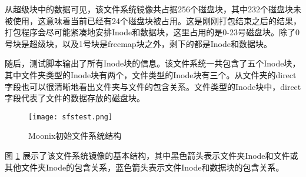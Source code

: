 从超级块中的数据可见，该文件系统镜像共占据256个磁盘块，其中232个磁盘块未被使用，这意味着当前已经有24个磁盘块被占用。这是刚刚打包结束之后的结果，打包程序会尽可能紧凑地安排Inode和数据块，这里占用的是0-23号磁盘块。除了0号块是超级块，以及1号块是freemap块之外，剩下的都是Inode和数据块。

随后，测试脚本输出了所有Inode块的信息。该文件系统一共包含了五个Inode块，其中文件夹类型的Inode块有两个，文件类型的Inode块有三个。从文件夹的direct字段也可以很清晰地看出文件夹与文件的包含关系。文件类型的Inode块中，direct字段代表了文件的数据存放的磁盘块。

\begin{figure}[htpb]
	\centering
	\texttt{[image: sfstest.png]}
	\setlength{\abovecaptionskip}{2pt}
	\caption{Moonix初始文件系统结构}
	\label{pic:sfstest}
\end{figure}

图 \ref{pic:sfstest} 展示了该文件系统镜像的基本结构，其中黑色箭头表示文件夹Inode和文件或其他文件夹Inode的包含关系，蓝色箭头表示文件Inode和数据块的包含关系。
